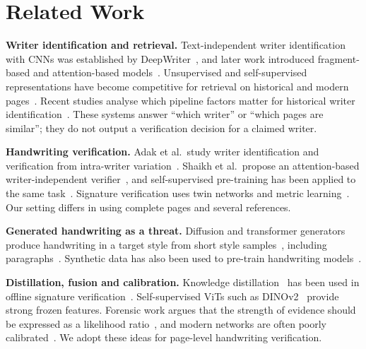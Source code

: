 \section{Related Work}
\textbf{Writer identification and retrieval.}
Text-independent writer identification with CNNs was established by DeepWriter~\cite{xing2016deepwriter}, and later work introduced fragment-based and attention-based models~\cite{he2020fragnet,kumar2024attention}.
Unsupervised and self-supervised representations have become competitive for retrieval on historical and modern pages~\cite{christlein2017unsupervised,peer2023towards,raven2024selfsupervised,maitra2024decorrelationbased}.
Recent studies analyse which pipeline factors matter for historical writer identification~\cite{rasyidi2025beyond}.
These systems answer ``which writer'' or ``which pages are similar''; they do not output a verification decision for a claimed writer.

\textbf{Handwriting verification.}
Adak et al.\ study writer identification and verification from intra-writer variation~\cite{adak2017an,adak2019intravariable}.
Shaikh et al.\ propose an attention-based writer-independent verifier~\cite{shaikh2020attention}, and self-supervised pre-training has been applied to the same task~\cite{chauhan2024selfsupervised,wang2023csslrha}.
Signature verification uses twin networks and metric learning~\cite{dey2017signet,huang2023multiscale,parracho2025signature}.
Our setting differs in using complete pages and several references.

\textbf{Generated handwriting as a threat.}
Diffusion and transformer generators produce handwriting in a target style from short style samples~\cite{nikolaidou2023wordstylist,nikolaidou2024diffusionpen,vanherle2024vatr}, including paragraphs~\cite{mayr2024zeroshot}.
Synthetic data has also been used to pre-train handwriting models~\cite{pippi2023evaluating}.

\textbf{Distillation, fusion and calibration.}
Knowledge distillation~\cite{hinton2015distilling} has been used in offline signature verification~\cite{tsourounis2023leveraging}.
Self-supervised ViTs such as DINOv2~\cite{oquab2023dinov} provide strong frozen features.
Forensic work argues that the strength of evidence should be expressed as a likelihood ratio~\cite{ypma2024evidential}, and modern networks are often poorly calibrated~\cite{guo2017on}.
We adopt these ideas for page-level handwriting verification.
